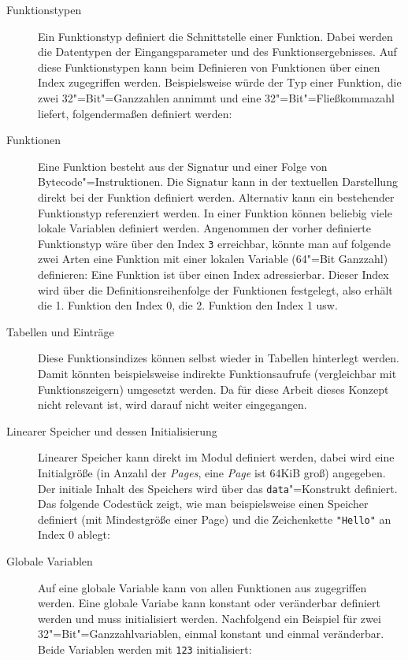 \begin{description}
    \item[Funktionstypen] Ein Funktionstyp definiert die Schnittstelle einer Funktion. Dabei werden die Datentypen der Eingangsparameter und des Funktionsergebnisses. Auf diese Funktionstypen kann beim Definieren von Funktionen über einen Index zugegriffen werden. Beispielsweise würde der Typ einer Funktion, die zwei 32"=Bit"=Ganzzahlen annimmt und eine 32"=Bit"=Fließkommazahl liefert, folgendermaßen definiert werden: 
    \item[Funktionen] Eine Funktion besteht aus der Signatur und einer Folge von Bytecode"=Instruktionen. Die Signatur kann in der textuellen Darstellung direkt bei der Funktion definiert werden. Alternativ kann ein bestehender Funktionstyp referenziert werden. In einer Funktion können beliebig viele lokale Variablen definiert werden. Angenommen der vorher definierte Funktionstyp wäre über den Index \lstinline{3} erreichbar, könnte man auf folgende zwei Arten eine Funktion mit einer lokalen Variable (64"=Bit Ganzzahl) definieren: 
    Eine Funktion ist über einen Index adressierbar. Dieser Index wird über die Definitionsreihenfolge der Funktionen festgelegt, also erhält die 1. Funktion den Index 0, die 2. Funktion den Index 1 usw.
    \item[Tabellen und Einträge] Diese Funktionsindizes können selbst wieder in Tabellen hinterlegt werden. Damit könnten beispielsweise indirekte Funktionsaufrufe (vergleichbar mit Funktionszeigern) umgesetzt werden. Da für diese Arbeit dieses Konzept nicht relevant ist, wird darauf nicht weiter  eingegangen.
    \item[Linearer Speicher und dessen Initialisierung] Linearer Speicher kann direkt im Modul definiert werden, dabei wird eine Initialgröße (in Anzahl der \emph{Pages}, eine \emph{Page} ist 64KiB groß) angegeben. Der initiale Inhalt des Speichers wird über das \lstinline{data}"=Konstrukt definiert. Das folgende Codestück zeigt, wie man beispielsweise einen Speicher definiert (mit Mindestgröße einer Page) und die Zeichenkette \lstinline{"Hello"} an Index 0 ablegt: 
    \item[Globale Variablen] Auf eine globale Variable kann von allen Funktionen aus zugegriffen werden. Eine globale Variabe kann konstant oder veränderbar definiert werden und muss initialisiert werden. Nachfolgend ein Beispiel für zwei 32"=Bit"=Ganzzahlvariablen, einmal konstant und einmal veränderbar. Beide Variablen werden mit \lstinline{123} initialisiert: 

\end{description}
